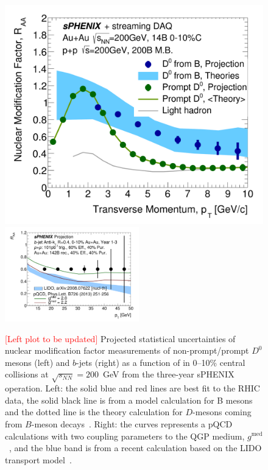 \begin{figure}[htbp]
\centering
\includegraphics[width=0.435\linewidth]{figs/RAA_DB_theory_root_RAADB_pp200B.pdf}
\includegraphics[width=0.52\textwidth]{figs/200pp_pythia8_CTEQ6L_7GeV_ALL_cfg_eneg_DSTReader_root_Draw_HFJetTruth_CrossSection2RAA_Theory_3yr_deta0_70.pdf}
\caption{{\textcolor{red}{[Left plot to be updated]}} Projected
  statistical uncertainties of nuclear modification factor \raa
  measurements of non-prompt/prompt $D^0$ mesons (left) and $b$-jets
  (right) as a function of \pT in 0--10\% central \auau collisions at
  $\sqrt{s_{NN}}=200$~GeV from the three-year sPHENIX operation. Left:
  the solid blue and red lines are best fit to the RHIC data, the
  solid black line is from a model calculation for B mesons and the
  dotted line is the theory calculation for $D$-mesons coming from
  $B$-meson decays~\cite{Duke,TAMU,PHSD,CUJET}. Right: the curves
  represents a pQCD calculations with two coupling parameters to the
  QGP medium, $g^{\textrm{med}}$~\cite{Huang:2013vaa}, and the blue
  band is from a recent calculation based on the LIDO transport
  model~\cite{Ke:2020nsm}. }
\label{fig:HF-inclusive-RAA}
\end{figure}

